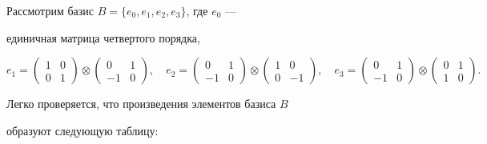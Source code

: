 \begin{pf} Рассмотрим базис $B=\{e_0,e_1,e_2,e_3\}$, где $e_0$ --- 


единичная матрица четвертого порядка, 


$$ 


e_1= 


\begin{pmatrix} 


1&0\\0&1 


\end{pmatrix} 


\otimes 


\begin{pmatrix} 


0&1\\-1&0 


\end{pmatrix} 


,\quad e_2= 


\begin{pmatrix} 


0&1\\-1&0 


\end{pmatrix} 


\otimes 


\begin{pmatrix} 


1&0\\0&-1 


\end{pmatrix} 


,\quad 


e_3= 


\begin{pmatrix} 


0&1\\-1&0 


\end{pmatrix} 


\otimes 


\begin{pmatrix} 


0&1\\1&0 


\end{pmatrix} 


. 


$$ 


Легко проверяется, что произведения элементов базиса $B$


образуют следующую таблицу:






\end{pf}
